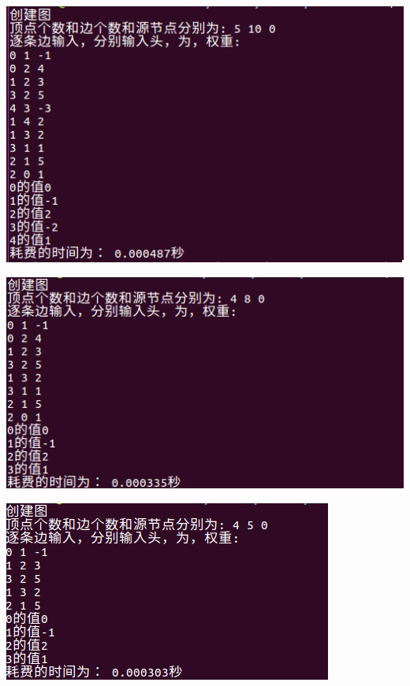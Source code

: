 \documentclass{ctexart}
\begin{document}
\begin{center}
  \includegraphics[scale=0.5]{ss4.png}
  \hspace{0.1in}
\end{center}
\begin{center}
  \includegraphics[scale=0.6]{ss5.png}
  \hspace{0.1in}
\end{center}
\begin{center}
  \includegraphics[scale=0.6]{ss7.png}
  \hspace{0.1in}
\end{center}
\end{document}
